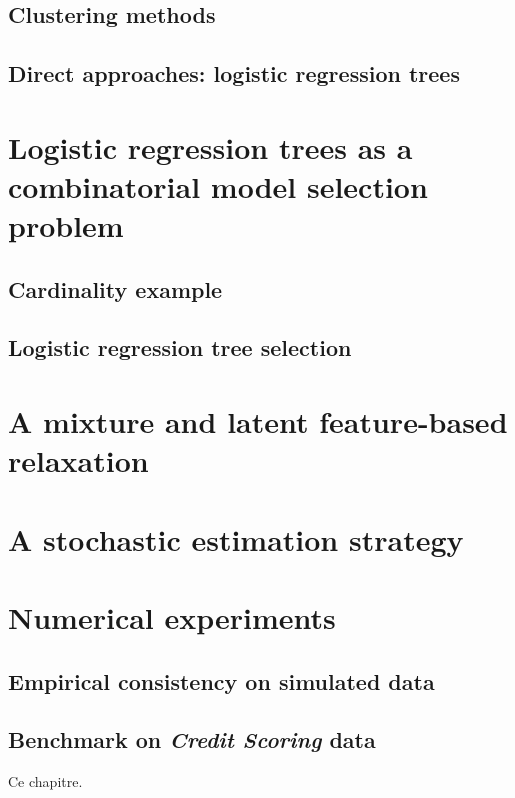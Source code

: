 \subsection{Clustering methods}


\subsection{Direct approaches: logistic regression trees}



\section{Logistic regression trees as a combinatorial model selection problem} \label{sec:model_selec_tree}


\subsection{Cardinality example}


\subsection{Logistic regression tree selection}



\section{A mixture and latent feature-based relaxation}




\section{A stochastic estimation strategy}


\section{Numerical experiments}


\subsection{Empirical consistency on simulated data}

\subsection{Benchmark on \textit{Credit Scoring} data}




\bigskip

Ce chapitre.


\printbibliography[heading=subbibliography, title=References of Chapter 5]

